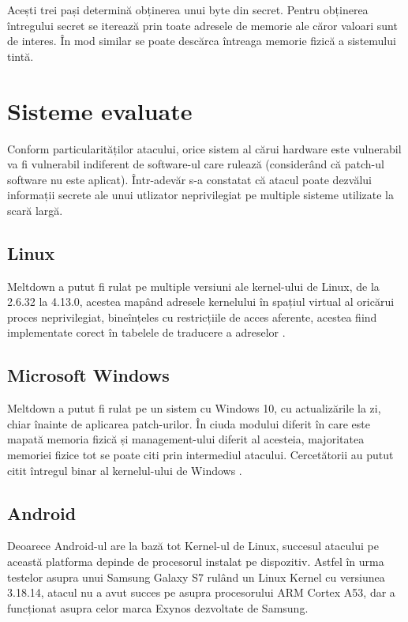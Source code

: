 Acești trei pași determină obținerea unui byte din secret. Pentru obținerea
întregului secret se iterează prin toate adresele de memorie ale căror valoari
sunt de interes. În mod similar se poate descărca întreaga memorie fizică a 
sistemului tintă.

\section{Sisteme evaluate}

Conform particularităților atacului, orice sistem al cărui hardware este
vulnerabil va fi vulnerabil indiferent de software-ul care rulează (considerând
că patch-ul software nu este aplicat). Într-adevăr s-a constatat că atacul
poate dezvălui informații secrete ale unui utlizator neprivilegiat pe multiple 
sisteme utilizate la scară largă.

\subsection{Linux}

Meltdown a putut fi rulat pe multiple versiuni ale kernel-ului de Linux, de la
2.6.32 la 4.13.0, acestea mapând adresele kernelului în spațiul virtual al
oricărui proces neprivilegiat, bineînțeles cu restricțiile de acces aferente, acestea
fiind implementate corect în tabelele de traducere a adreselor \cite{meltdown2018}.

\subsection{Microsoft Windows}

Meltdown a putut fi rulat pe un sistem cu Windows 10, cu actualizările la zi,
chiar înainte de aplicarea patch-urilor. În ciuda modului diferit în care este
mapată memoria fizică și management-ului diferit al acesteia, majoritatea memoriei
fizice tot se poate citi prin intermediul atacului. Cercetătorii au putut citit 
întregul binar al kernelul-ului de Windows \cite{meltdown2018}.

\subsection{Android}

Deoarece Android-ul are la bază tot Kernel-ul de Linux, succesul atacului pe
această platforma depinde de procesorul instalat pe dispozitiv. Astfel în urma
testelor asupra unui Samsung Galaxy S7 rulând un Linux Kernel cu versiunea
3.18.14, atacul nu a avut succes pe asupra procesorului ARM Cortex A53, dar a
funcționat asupra celor marca Exynos dezvoltate de Samsung.

